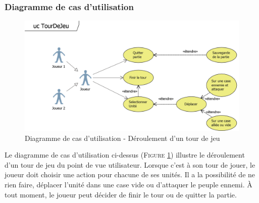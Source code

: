 \documentclass[a4paper,11pt]{article}
\begin{document}
		\subsubsection{Diagramme de cas d'utilisation}
			\begin{figure}[ht!]
				\includegraphics{Diagrammes/Tour/ucTourDeJeu.png}
				\caption{Diagramme de cas d'utilisation - Déroulement d'un tour de jeu}
				\label{fig:uctour}
			\end{figure}
			\vspace*{1cm}
			Le diagramme de cas d'utilisation ci-dessus (\textsc{Figure \ref{fig:uctour}}) illustre le déroulement d'un tour de jeu du point de vue utilisateur. Lorsque c'est à son tour de jouer, le joueur doit choisir une action pour chacune de ses unités. Il a la possibilité de ne rien faire, déplacer l'unité dans une case vide ou d'attaquer le peuple ennemi. À  tout moment, le joueur peut décider de finir le tour ou de quitter la partie.
			\newpage
\end{document}
